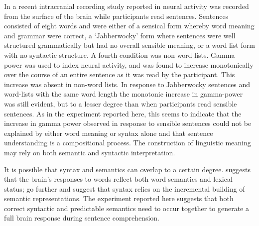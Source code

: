 \documentclass[a4paper,10pt,twoside]{article}
\begin{document}

In a recent intracranial recording study reported in
\cite{FedorenkoEtAl2016} neural activity was recorded from the surface
of the brain while participants read sentences. Sentences consisted of
eight words and were either of a sensical form whereby word meaning
and grammar were correct, a \lq{}Jabberwocky\rq{} form where sentences were
well structured grammatically but had no overall sensible meaning, or
a word list form with no syntactic structure. A fourth condition was
non-word lists. Gamma-power was used to index neural activity, and was
found to increase monotonically over the course of an entire sentence
as it was read by the participant. This increase was absent in
non-word lists. In response to Jabberwocky sentences and word-lists
with the same word length the monotonic increase in gamma-power was
still evident, but to a lesser degree than when participants read
sensible sentences. As in the experiment reported here, this seems to
indicate that the increase in gamma power observed in response to
sensible sentences could not be explained by either word meaning or
syntax alone and that sentence understanding is a compositional
process. The construction of linguistic meaning may rely on both
semantic and syntactic interpretation.

It is possible that syntax and semantics can overlap to a certain
degree. \cite{Pulvermuller2002} suggests that the brain's responses to
words reflect both word semantics and lexical status;
\cite{KempsonEtAl2016} go further and suggest that syntax relies on
the incremental building of semantic representations. The experiment
reported here suggests that both correct syntactic and predictable
semantics need to occur together to generate a full brain response
during sentence comprehension. 

%

\end{document}
